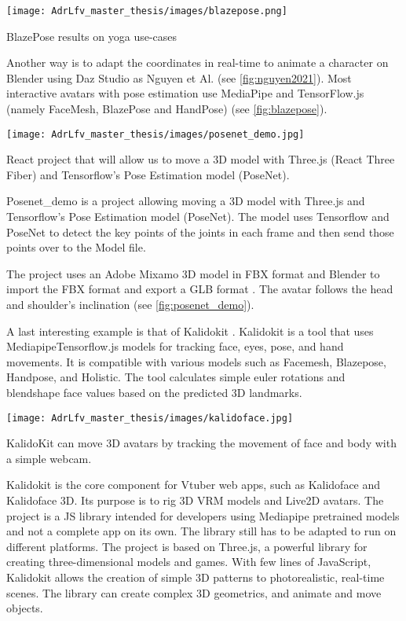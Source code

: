 \begin{marginfigure}
    \centering
    \texttt{[image: AdrLfv\_master\_thesis/images/blazepose.png]}
    \caption{BlazePose results on yoga use-cases}
    \label{fig:blazepose}
\end{marginfigure}

Another way is to adapt the coordinates in real-time to animate a character on Blender using Daz Studio as Nguyen et Al. \cite{nguyen2021automatic} (see \ref{fig:nguyen2021}). Most interactive avatars with pose estimation use MediaPipe and TensorFlow.js (namely FaceMesh, BlazePose and HandPose) \cite{blazepose} (see \ref{fig:blazepose}).

\begin{marginfigure}
    \centering
    \texttt{[image: AdrLfv\_master\_thesis/images/posenet\_demo.jpg]}
    \caption{React project that will allow us to move a 3D model with Three.js (React Three Fiber) and Tensorflow's Pose Estimation model (PoseNet).}
    \label{fig:posenet_demo}
\end{marginfigure}

Posenet\_demo \cite{posenet_demo} is a project allowing moving a 3D model with Three.js and Tensorflow’s Pose Estimation model (PoseNet). The model uses Tensorflow and PoseNet to detect the key points of the joints in each frame and then send those points over to the Model file. 

The project uses an Adobe Mixamo \cite{mixamo} 3D model in FBX format and Blender to import the FBX format and export a GLB format \cite{posenet}. The avatar follows the head and shoulder's inclination (see \ref{fig:posenet_demo}).

A last interesting example is that of Kalidokit \cite{kalidokit}. Kalidokit is a tool that uses Mediapipe\/Tensorflow.js models for tracking face, eyes, pose, and hand movements.
It is compatible with various models such as Facemesh, Blazepose, Handpose, and Holistic. The tool calculates simple euler rotations and blendshape face values based on the predicted 3D landmarks.

\begin{marginfigure}
    \centering
    \texttt{[image: AdrLfv\_master\_thesis/images/kalidoface.jpg]}
    \caption{KalidoKit can move 3D avatars by tracking the movement of face and body with a simple webcam.}
    \label{fig:kalidoface}
\end{marginfigure}

Kalidokit is the core component for Vtuber web apps, such as Kalidoface and Kalidoface 3D. Its purpose is to rig 3D VRM models and Live2D avatars. The project is a JS library intended for developers using Mediapipe pretrained models and not a complete app on its own. The library still has to be adapted to run on different platforms. The project is based on Three.js, a powerful library for creating three-dimensional models and games. 
With few lines of JavaScript, Kalidokit allows the creation of simple 3D patterns to photorealistic, real-time scenes. The library can create complex 3D geometrics, and animate and move objects.

